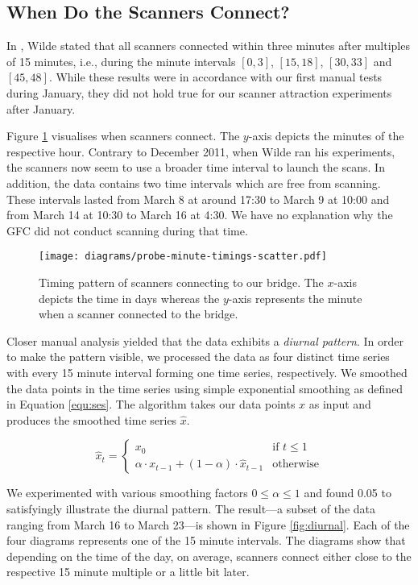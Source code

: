 \documentclass[runningheads,a4paper]{llncs}
\begin{document}
\subsection{When Do the Scanners Connect?}
In \cite{twilde}, Wilde stated that all scanners connected within three minutes after multiples of
15 minutes, i.e., during the minute intervals $[0,3]$, $[15,18]$, $[30,33]$ and $[45,48]$. While
these results were in accordance with our first manual tests during January, they did not hold true
for our scanner attraction experiments after January.

Figure \ref{fig:timing} visualises when scanners connect. The $y$-axis depicts the minutes of the
respective hour. Contrary to December 2011, when Wilde ran his experiments, the scanners now seem to
use a broader time interval to launch the scans. In addition, the data contains two time intervals
which are free from scanning. These intervals lasted from March 8 at around 17:30 to March 9 at
10:00 and from March 14 at 10:30 to March 16 at 4:30. We have no explanation why the GFC did not
conduct scanning during that time.

\begin{figure}
\centering
\texttt{[image: diagrams/probe-minute-timings-scatter.pdf]}
\caption{Timing pattern of scanners connecting to our bridge. The $x$-axis depicts the time in days
whereas the $y$-axis represents the minute when a scanner connected to the bridge.}
\label{fig:timing}
\end{figure}

Closer manual analysis yielded that the data exhibits a \emph{diurnal pattern}. In order to make the
pattern visible, we processed the data as four distinct time series with every 15 minute interval
forming one time series, respectively. We smoothed the data points in the time series using simple
exponential smoothing as defined in Equation \ref{equ:ses}. The algorithm takes our data points $x$
as input and produces the smoothed time series $\hat{x}$.

\begin{equation}
\label{equ:ses}
\hat{x}_{t} =
\begin{cases}
x_{0} & \mbox{if } t \le 1 \\
\alpha \cdot x_{t-1} + (1 - \alpha) \cdot \hat{x}_{t-1} & \mbox{otherwise}
\end{cases}
\end{equation}

We experimented with various smoothing factors $0 \le \alpha \le 1$ and found 0.05 to satisfyingly
illustrate the diurnal pattern. The result---a subset of the data ranging from March 16 to March
23---is shown in Figure \ref{fig:diurnal}. Each of the four diagrams represents one of the 15 minute
intervals. The diagrams show that depending on the time of the day, on average, scanners connect
either close to the respective 15 minute multiple or a little bit later.
\end{document}
